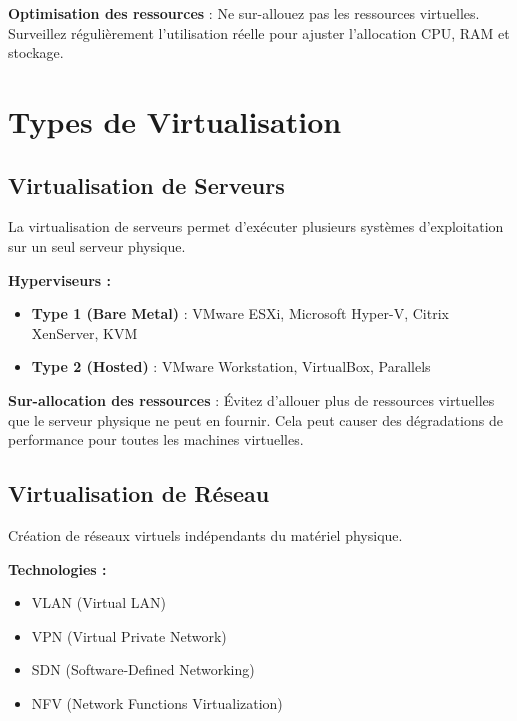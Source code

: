 \documentclass[11pt,a4paper]{article}
\begin{document}
\begin{tipbox}
\textbf{Optimisation des ressources} : Ne sur-allouez pas les ressources virtuelles. Surveillez régulièrement l'utilisation réelle pour ajuster l'allocation CPU, RAM et stockage.
\end{tipbox}

\section{Types de Virtualisation}

\subsection{Virtualisation de Serveurs}

La virtualisation de serveurs permet d'exécuter plusieurs systèmes d'exploitation sur un seul serveur physique.

\textbf{Hyperviseurs :}
\begin{itemize}
    \item \textbf{Type 1 (Bare Metal)} : VMware ESXi, Microsoft Hyper-V, Citrix XenServer, KVM
    \item \textbf{Type 2 (Hosted)} : VMware Workstation, VirtualBox, Parallels
\end{itemize}

\begin{dangerbox}
\textbf{Sur-allocation des ressources} : Évitez d'allouer plus de ressources virtuelles que le serveur physique ne peut en fournir. Cela peut causer des dégradations de performance pour toutes les machines virtuelles.
\end{dangerbox}

\subsection{Virtualisation de Réseau}

Création de réseaux virtuels indépendants du matériel physique.

\textbf{Technologies :}
\begin{itemize}
    \item VLAN (Virtual LAN)
    \item VPN (Virtual Private Network)
    \item SDN (Software-Defined Networking)
    \item NFV (Network Functions Virtualization)
\end{itemize}
\end{document}
